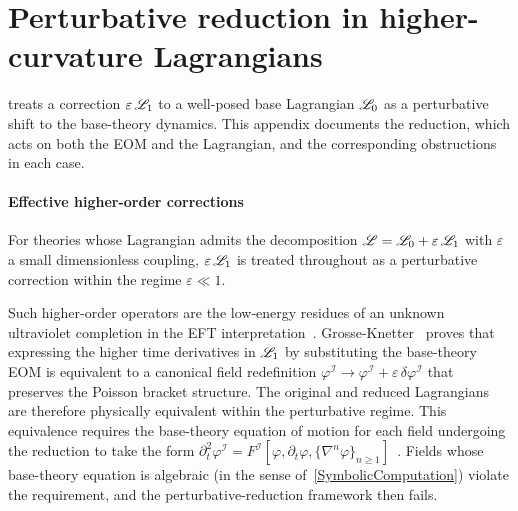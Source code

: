 %

\section{Perturbative reduction in higher-curvature Lagrangians}%
\label{PerturbativeReduction}

\TIDAL{} treats a correction $\varepsilon\,\mathscr{L}_1$ to a well-posed base
Lagrangian $\mathscr{L}_0$ as a perturbative shift to the base-theory dynamics. This
appendix documents the reduction, which acts on both the EOM and
the Lagrangian, and the corresponding obstructions in each case.

\paragraph*{Effective higher-order corrections}
For theories whose Lagrangian admits the decomposition
$\mathscr{L} = \mathscr{L}_0 + \varepsilon\,\mathscr{L}_1$ with $\varepsilon$ a small
dimensionless coupling, $\varepsilon\,\mathscr{L}_1$ is treated throughout as a
perturbative correction within the regime $\varepsilon\ll1$.

Such higher-order operators are the low-energy residues of an unknown ultraviolet
completion in the EFT
interpretation~\cite{Simon:1990ic,Simon:1990jn,Donoghue:1994dn,burgess2003quantum}.
Grosse-Knetter~\cite{Grosse-Knetter:1993tae,ostrogradsky1850memoires,Woodard:2015zca}
proves that expressing the higher time derivatives in $\mathscr{L}_1$ by substituting
the base-theory EOM is equivalent to a canonical field redefinition
$\varphi^{\mathcal{I}} \to \varphi^{\mathcal{I}} + \varepsilon\,\delta\varphi^{\mathcal{I}}$
that preserves the Poisson bracket structure.
The original and reduced Lagrangians are
therefore physically equivalent within the perturbative regime.
This equivalence requires the base-theory equation of motion for each field undergoing the reduction to
take the form $\partial_t^2\varphi^{\mathcal{I}} = F^{\mathcal{I}}[\varphi,\partial_t\varphi,
\{\nabla^n\varphi\}_{n\geq 1}]$~\cite{Grosse-Knetter:1993tae}. Fields whose base-theory
equation is algebraic (in the sense of~\cref{SymbolicComputation}) violate the
requirement, and the perturbative-reduction framework then fails.

